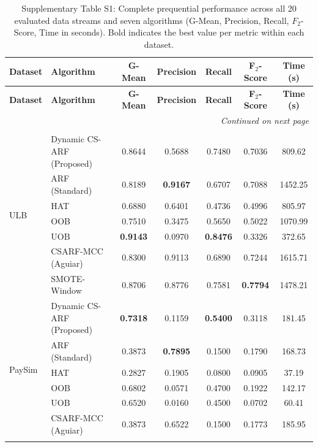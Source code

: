 \begin{longtable}{|l|l|c|c|c|c|c|}
\caption{Supplementary Table S1: Complete prequential performance across all 20 evaluated data streams and seven algorithms (G-Mean, Precision, Recall, $F_2$-Score, Time in seconds). Bold indicates the best value per metric within each dataset.} \label{tab:supp_full_results} \\
\hline
\textbf{Dataset} & \textbf{Algorithm} & \textbf{G-Mean} & \textbf{Precision} & \textbf{Recall} & \textbf{F$_2$-Score} & \textbf{Time (s)} \\ \hline
\endfirsthead
\hline
\textbf{Dataset} & \textbf{Algorithm} & \textbf{G-Mean} & \textbf{Precision} & \textbf{Recall} & \textbf{F$_2$-Score} & \textbf{Time (s)} \\ \hline
\endhead
\hline \multicolumn{7}{r}{\textit{Continued on next page}} \\ \hline
\endfoot
\hline
\endlastfoot
\multicolumn{7}{|l|}{\textbf{High Real-World Imbalance}} \\ \hline
\multirow{7}{*}{ULB} & Dynamic CS-ARF (Proposed) & 0.8644 & 0.5688 & 0.7480 & 0.7036 & 809.62 \\ \cline{2-7}
 & ARF (Standard) & 0.8189 & \textbf{0.9167} & 0.6707 & 0.7088 & 1452.25 \\ \cline{2-7}
 & HAT & 0.6880 & 0.6401 & 0.4736 & 0.4996 & 805.97 \\ \cline{2-7}
 & OOB & 0.7510 & 0.3475 & 0.5650 & 0.5022 & 1070.99 \\ \cline{2-7}
 & UOB & \textbf{0.9143} & 0.0970 & \textbf{0.8476} & 0.3326 & 372.65 \\ \cline{2-7}
 & CSARF-MCC (Aguiar) & 0.8300 & 0.9113 & 0.6890 & 0.7244 & 1615.71 \\ \cline{2-7}
 & SMOTE-Window & 0.8706 & 0.8776 & 0.7581 & \textbf{0.7794} & 1478.21 \\ \hline
\multirow{7}{*}{PaySim} & Dynamic CS-ARF (Proposed) & \textbf{0.7318} & 0.1159 & \textbf{0.5400} & 0.3118 & 181.45 \\ \cline{2-7}
 & ARF (Standard) & 0.3873 & \textbf{0.7895} & 0.1500 & 0.1790 & 168.73 \\ \cline{2-7}
 & HAT & 0.2827 & 0.1905 & 0.0800 & 0.0905 & 37.19 \\ \cline{2-7}
 & OOB & 0.6802 & 0.0571 & 0.4700 & 0.1922 & 142.17 \\ \cline{2-7}
 & UOB & 0.6520 & 0.0160 & 0.4500 & 0.0702 & 60.41 \\ \cline{2-7}
 & CSARF-MCC (Aguiar) & 0.3873 & 0.6522 & 0.1500 & 0.1773 & 185.95 \\ \cline{2-7}

\end{longtable}

